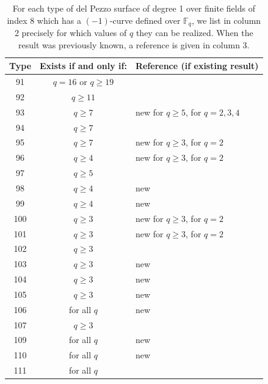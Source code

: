 \documentclass[a4paper, 11pt, reqno]{amsart}
\numberwithin{equation}{section} \numberwithin{figure}{section}
\def \F {{\mathbb F}}
\theoremstyle{definition}
\numberwithin{lemma}{section}
\begin{document}
\begin{table}[ht]
    \centering
    \caption{For each type of del Pezzo surface of degree 1 over finite fields of index 8 which has a $(-1)$-curve defined over $\F_q$, we list in column 2 precisely for which values of $q$ they can be realized. When the result was previously known, a reference is given in column 3.}
    \begin{tabular}{|c|c|l|}
    \hline
            Type & Exists if and only if: & Reference (if existing result)\\
            \hline
            91 & $q = 16$ or $q \geq 19$ & \cite[16]{BFL}\\
            92 & $q \geq 11$ & \cite[16]{BFL}\\
            93 & $q \geq 7$ & new for $q \geq 5$, \cite[17]{BFL} for $q = 2, 3, 4$ \\
            94 & $q \geq 7$ & \cite[16]{BFL}\\
            95 & $q \geq 7$ & new for $q \geq 3$, \cite[18]{BFL} for $q = 2$\\ 
            96 & $q \geq 4$ & new for $q \geq 3$, \cite[17]{BFL} for $q = 2$\\
            97 & $q \geq 5$ & \cite[17]{BFL}\\
            98 & $q \geq 4$ & new\\
            99 & $q \geq 4$ & new\\
            100 & $q \geq 3$ & new for $q \geq 3$, \cite[18]{BFL} for $q = 2$\\
            101 & $q \geq 3$ & new for $q \geq 3$, \cite[18]{BFL} for $q = 2$ \\
            102 & $q \geq 3$ & \cite[17]{BFL}\\
            103 & $q \geq 3$ & new\\
            104 & $q \geq 3$ & new\\
            105 & $q \geq 3$ & new\\
            106 & for all $q$ & new\\
            107 & $q \geq 3$ & \cite[17]{BFL}\\
            109 & for all $q$ & new\\
            110 & for all $q$ & new\\
            111 & for all $q$ & \cite[18]{BFL}\\
            \hline
    \end{tabular}
    \label{tab:dp1index8withline}
\end{table}
\end{document}
